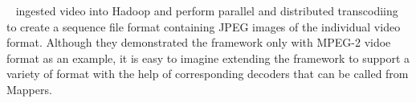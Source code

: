 \citeauthor{2013_Pivotal}~\cite{2013_Pivotal} ingested video into Hadoop and
perform parallel and distributed transcodiing to create a sequence file format
containing JPEG images of the individual video format. Although they
demonstrated the framework only with MPEG-2 vidoe format as an example, it is
easy to imagine extending the framework to support a variety of format with the
help of corresponding decoders that can be called from Mappers. 



 
 